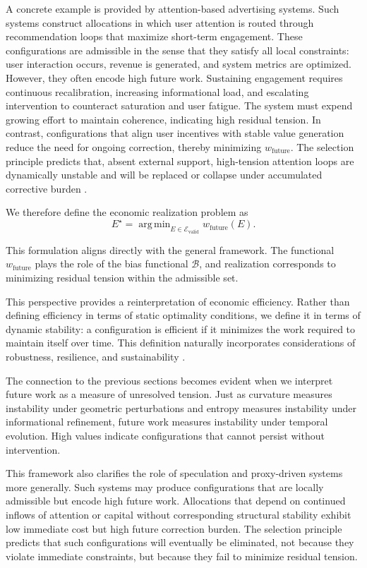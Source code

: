 \documentclass[11pt]{article}
\theoremstyle{plain}
\theoremstyle{definition}
\theoremstyle{remark}
\DeclareMathOperator{\argmin}{arg\,min}
\begin{document}
A concrete example is provided by attention-based advertising systems. Such systems construct allocations in which user attention is routed through recommendation loops that maximize short-term engagement. These configurations are admissible in the sense that they satisfy all local constraints: user interaction occurs, revenue is generated, and system metrics are optimized. However, they often encode high future work. Sustaining engagement requires continuous recalibration, increasing informational load, and escalating intervention to counteract saturation and user fatigue. The system must expend growing effort to maintain coherence, indicating high residual tension. In contrast, configurations that align user incentives with stable value generation reduce the need for ongoing correction, thereby minimizing $w_{\mathrm{future}}$. The selection principle predicts that, absent external support, high-tension attention loops are dynamically unstable and will be replaced or collapse under accumulated corrective burden \cite{Zuboff2019, Varian2019}.

We therefore define the economic realization problem as
\[
E^\star = \argmin_{E \in \mathcal{E}_{\mathrm{valid}}} w_{\mathrm{future}}(E).
\]

This formulation aligns directly with the general framework. The functional $w_{\mathrm{future}}$ plays the role of the bias functional $\mathcal{B}$, and realization corresponds to minimizing residual tension within the admissible set.

This perspective provides a reinterpretation of economic efficiency. Rather than defining efficiency in terms of static optimality conditions, we define it in terms of dynamic stability: a configuration is efficient if it minimizes the work required to maintain itself over time. This definition naturally incorporates considerations of robustness, resilience, and sustainability \cite{GeorgescuRoegen1971, Daly1996}.

The connection to the previous sections becomes evident when we interpret future work as a measure of unresolved tension. Just as curvature measures instability under geometric perturbations and entropy measures instability under informational refinement, future work measures instability under temporal evolution. High values indicate configurations that cannot persist without intervention.

This framework also clarifies the role of speculation and proxy-driven systems more generally. Such systems may produce configurations that are locally admissible but encode high future work. Allocations that depend on continued inflows of attention or capital without corresponding structural stability exhibit low immediate cost but high future correction burden. The selection principle predicts that such configurations will eventually be eliminated, not because they violate immediate constraints, but because they fail to minimize residual tension.
\end{document}
